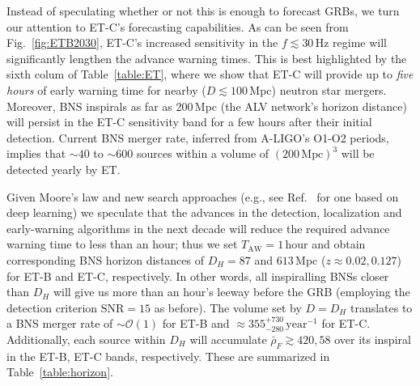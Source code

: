 \documentclass[prd,amsmath,amssymb,aps,floats,amsfonts,notitlepage,superscriptaddress,eqsecnum,nofootinbib,10pt]{revtex4-1}
\begin{document}
Instead of speculating whether or not this is enough to forecast GRBs, we turn our attention to ET-C's forecasting capabilities.
As can be seen from Fig.~\ref{fig:ETB2030}, ET-C's increased sensitivity in the $f\lesssim 30\,$Hz regime will significantly lengthen the advance warning times.
This is best highlighted by the sixth colum of Table~\ref{table:ET}, 
where we show that ET-C will provide up to \emph{five hours} of early warning time for nearby ($D\lesssim 100\,$Mpc) neutron star mergers.
Moreover, BNS inspirals as far as 200\,Mpc (the ALV network's horizon distance) will persist in the ET-C sensitivity band for a few hours after their initial detection.
Current BNS merger rate, inferred from A-LIGO's O1-O2 periods, implies that $\sim 40$ to $\sim600$ sources within a volume of $(200\,\text{Mpc})^3$ will be detected yearly by ET.

Given Moore's law and new search approaches (e.g., see Ref.~\cite{Gabbard:2017lja} for one based on deep learning) 
we speculate that the advances in the detection, localization and early-warning algorithms in the next decade will reduce the required advance
warning time to less than an hour; thus we set $T_\text{AW} = 1\,\text{hour}$ and obtain corresponding BNS horizon distances of $D_H=87$ and $613\,$Mpc ($z\approx 0.02,0.127$) for ET-B and ET-C, respectively.
In other words, all inspiralling BNSs closer than $D_H$ will give us more than an hour's leeway before the GRB (employing the detection criterion $\text{SNR} =15$ as before).
The volume set by $D=D_H$ translates to a BNS merger rate of $\sim\mathcal{O}(1)$ for ET-B and
$\approx 355^{+730}_{-280}\,\text{year}^{-1}$ for ET-C. Additionally, each source within $D_H$ will accumulate $\bar\rho_F \gtrsim 420, 58$ over its inspiral
in the ET-B, ET-C bands, respectively. These are summarized in Table~\ref{table:horizon}.
\end{document}
